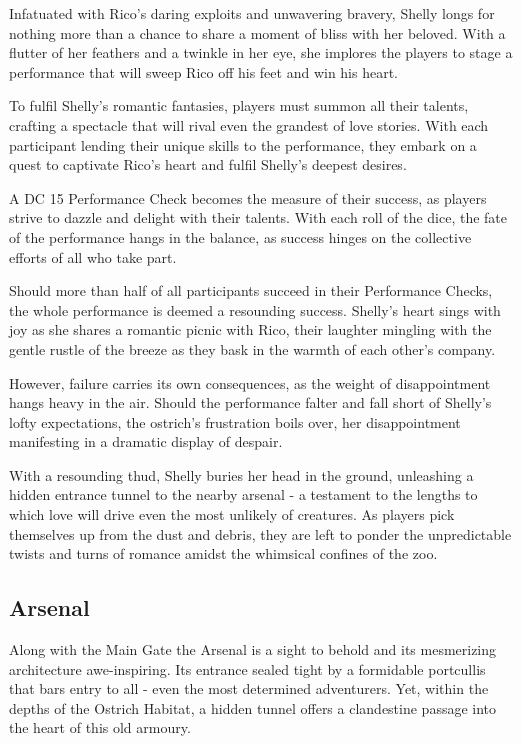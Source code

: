 Infatuated with Rico's daring exploits and unwavering bravery, Shelly longs for nothing more than a chance to share a moment of bliss with her beloved. With a flutter of her feathers and a twinkle in her eye, she implores the players to stage a performance that will sweep Rico off his feet and win his heart.

To fulfil Shelly's romantic fantasies, players must summon all their talents, crafting a spectacle that will rival even the grandest of love stories. With each participant lending their unique skills to the performance, they embark on a quest to captivate Rico's heart and fulfil Shelly's deepest desires.

A DC 15 Performance Check becomes the measure of their success, as players strive to dazzle and delight with their talents. With each roll of the dice, the fate of the performance hangs in the balance, as success hinges on the collective efforts of all who take part.

Should more than half of all participants succeed in their Performance Checks, the whole performance is deemed a resounding success. Shelly's heart sings with joy as she shares a romantic picnic with Rico, their laughter mingling with the gentle rustle of the breeze as they bask in the warmth of each other's company.\\\hfill

However, failure carries its own consequences, as the weight of disappointment hangs heavy in the air. Should the performance falter and fall short of Shelly's lofty expectations, the ostrich's frustration boils over, her disappointment manifesting in a dramatic display of despair.

With a resounding thud, Shelly buries her head in the ground, unleashing a hidden entrance tunnel to the nearby arsenal - a testament to the lengths to which love will drive even the most unlikely of creatures. As players pick themselves up from the dust and debris, they are left to ponder the unpredictable twists and turns of romance amidst the whimsical confines of the zoo.
\subsection*{ Arsenal}
Along with the Main Gate the Arsenal is a sight to behold and its mesmerizing architecture awe-inspiring.  Its entrance sealed tight by a formidable portcullis that bars entry to all - even the most determined adventurers. Yet, within the depths of the Ostrich Habitat, a hidden tunnel offers a clandestine passage into the heart of this old armoury.

